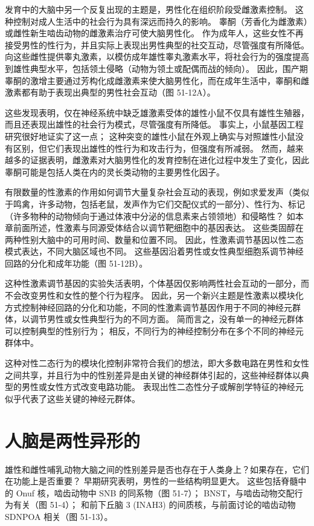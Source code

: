 发育中的大脑中另一个反复出现的主题是，男性化在组织阶段受雌激素控制。 这种控制对成人生活中的社会行为具有深远而持久的影响。 睾酮（芳香化为雌激素）或雌性新生啮齿动物的雌激素治疗可使大脑男性化。 作为成年人，这些女性不再接受男性的性行为，并且实际上表现出男性典型的社交互动，尽管强度有所降低。 向这些雌性提供睾丸激素，以模仿成年雄性睾丸激素水平，将社会行为的强度提高到雄性典型水平，包括领土侵略（动物为领土或配偶而战的倾向）。 因此，围产期睾酮的激增主要通过芳构化成雌激素来使大脑男性化，而在成年生活中，睾酮和雌激素都有助于表现出典型的男性社会互动（图 51-12A）。

这些发现表明，仅在神经系统中缺乏雄激素受体的雄性小鼠不仅具有雄性生殖器，而且还表现出雄性的社会行为模式，尽管强度有所降低。 事实上，小鼠基因工程研究很好地证实了这一点； 这种突变的雄性小鼠在外观上确实与对照雄性小鼠没有区别，但它们表现出雄性的性行为和攻击行为，但强度有所减弱。 然而，越来越多的证据表明，雌激素对大脑男性化的发育控制在进化过程中发生了变化，因此睾酮可能是包括人类在内的灵长类动物的主要男性化因子。

有限数量的性激素的作用如何调节大量复杂社会互动的表现，例如求爱发声（类似于鸣禽，许多动物，包括老鼠，发声作为它们交配仪式的一部分）、性行为、标记 （许多物种的动物倾向于通过体液中分泌的信息素来占领领地）和侵略性？ 如本章前面所述，性激素与同源受体结合以调节靶细胞中的基因表达。 这些类固醇在两种性别大脑中的可用时间、数量和位置不同。 因此，性激素调节基因以性二态模式表达，不同大脑区域也不同。 这些基因沿着男性或女性典型细胞系调节神经回路的分化和成年功能（图 51-12B）。

这种性激素调节基因的实验失活表明，个体基因仅影响两性社会互动的一部分，而不会改变男性和女性的整个行为程序。 因此，另一个新兴主题是性激素以模块化方式控制神经回路的分化和功能，不同的性激素调节基因作用于不同的神经元群体，以调节男性或女性典型行为的不同方面。 简而言之，没有单一的神经元群体可以控制典型的性别行为； 相反，不同行为的神经控制分布在多个不同的神经元群体中。

这种对性二态行为的模块化控制非常符合我们的想法，即大多数电路在男性和女性之间共享，并且行为中的性别差异是由关键的神经群体引起的，这些神经群体以典型的男性或女性方式改变电路功能。 表现出性二态性分子或解剖学特征的神经元似乎代表了这些关键的神经元群体。

\section{人脑是两性异形的}

雄性和雌性哺乳动物大脑之间的性别差异是否也存在于人类身上？如果存在，它们在功能上是否重要？ 早期研究表明，男性的一些结构明显更大。 这些包括脊髓中的 Onuf 核，啮齿动物中 SNB 的同系物（图 51-7）； BNST，与啮齿动物交配行为有关（图 51-4）； 和前下丘脑 3 (INAH3) 的间质核，与前面讨论的啮齿动物 SDNPOA 相关（图 51-13）。

